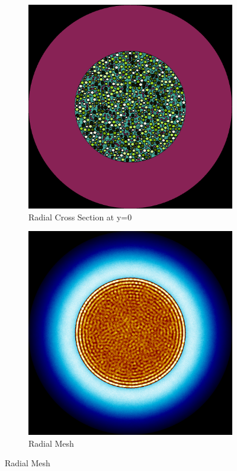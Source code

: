 \begin{figure}[H]
\centering

\begin{subfigure}{0.45\textwidth}
  \includegraphics[width=0.95\linewidth]{figures/control/control-r}
  \caption{Radial Cross Section at y=0}
  \label{fig:controla}
\end{subfigure}%
%
\begin{subfigure}{0.45\textwidth}
  \includegraphics[width=0.95\linewidth]{figures/control/control-rm}
  \caption{Radial Mesh}
  \label{fig:controlb}
\end{subfigure}


\end{figure}
